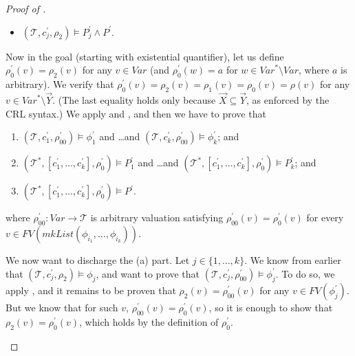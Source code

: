 \begin{proof}[Proof of ]
\begin{enumerate}
\begin{proofenv}
\begin{itemize}
            \item $(\mathcal{T}, c_j^\prime, \rho_2) \vDash P^\prime_j \land P^\prime$.
        \end{itemize}
    \end{proofenv}
    Now in the goal (starting with existential quantifier), let us define
    $\rho_0^\prime(v) = \rho_2(v)$ for any $v \in \mathit{Var}$ (and $\rho_0^\prime(w) = a$ for $w \in \mathit{Var}^* \setminus \mathit{Var}$, where $a$ is arbitrary).
    We verify that $\rho_0^\prime(v) = \rho_2(v) = \rho_1(v) = \rho_0(v) = \rho(v)$
    for any $v \in \mathit{Var}^* \setminus \vec{Y}$. (The last equality holds only because $\vec{X} \subseteq \vec{Y}$,
    as enforced by the CRL syntax.)
    We apply  and ,
    and then we have to prove that
    \begin{proofenv}
    \begin{enumerate}
        \item $(\mathcal{T}, c_1^\prime, \rho_{00}^\prime) \vDash \phi_{1}^\prime$ and \ldots and $(\mathcal{T}, c_k^\prime, \rho_{00}^\prime) \vDash \phi_{k}^\prime$; and
        \item $(\mathcal{T}^*, [ c_1^\prime,\ldots,c_k^\prime ], \rho_0^\prime) \vDash P_{1}^\prime$ and \ldots and 
        $(\mathcal{T}^*, [ c_1^\prime,\ldots,c_k^\prime ], \rho_0^\prime) \vDash P_{k}^\prime$; and
        \item $(\mathcal{T}^*, [ c_1^\prime,\ldots,c_k^\prime ], \rho_0^\prime) \vDash P^\prime$.
    \end{enumerate}
    where $\rho^\prime_{00} : \mathit{Var} \to \mathcal{T}$ is
    arbitrary valuation satisfying
    $\rho^\prime_{00}(v) = \rho_0^\prime(v)$ for every $v \in \mathit{FV}(\mathit{mkList}(\phi_{i_1},\ldots,\phi_{i_k}))$.
    \end{proofenv}
    We now want to discharge the (a) part. Let $j \in \{ 1, \ldots, k \}$.
    We know from earlier that $(\mathcal{T}, c^\prime_j,\rho_2) \vDash \phi_{j}$,
    and want to prove that $(\mathcal{T}, c^\prime_j, \rho^\prime_{00}) \vDash \phi^\prime_{j}$.
    To do so, we apply , and it remains to be proven that $\rho_{2}(v) = \rho^\prime_{00}(v)$
    for any $v \in \mathit{FV}(\phi^\prime_{j})$.
    But we know that for such $v$, $\rho^\prime_{00}(v) = \rho_0^\prime(v)$, so it is enough to show that
    $\rho_{2}(v) = \rho^\prime_0(v)$, which holds by the definition of $\rho^\prime_0$.

\end{enumerate}
\end{proof}
